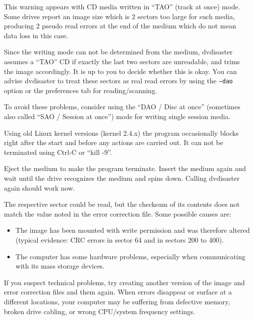    {This warning appears with CD media written in ``TAO'' (track at once) mode.
     Some drives report an image size which is 2 sectors too large for such media,
     producing 2 pseudo read errors at the end of the medium which do not mean data
     loss in this case.

     \smallskip
     
     Since the writing mode can not be determined from the medium, dvdisaster
     assumes a ``TAO'' CD if exactly the last two sectors are unreadable, and
     trims the image accordingly. It is up to you to decide whether this is okay.
     You can advise dvdisaster to treat these sectors as real read errors by using
     the {\tt --dao} option or the preferences tab for reading/scanning.

     \smallskip
     
     To avoid these problems, consider using the ``DAO / Disc at once''
     (sometimes also called ``SAO / Session at once'') mode for writing single session media.}

   { Using old Linux kernel versions (kernel 2.4.x) the program
     occasionally blocks right after the start and before any actions are
     carried out. It can not be terminated using Ctrl-C or ``kill -9''.

     \smallskip
     
     Eject the medium to make the program terminate. Insert the medium again
     and wait until the drive recognizes the medium and spins down. Calling
     dvdisaster again should work now. }

   {The respective sector could be read, but the checksum of its contents does
     not match the value noted in the error correction file. Some possible causes are:

 \begin{itemize}
 \item The image has been mounted with write permission and was
   therefore altered (typical evidence: CRC errors in sector 64 and in sectors 200 to 400).
 \item The computer has some hardware problems, especially when communicating with
   its mass storage devices.
 \end{itemize}
 
 If you suspect technical problems, try creating another version of the
 image and error correction files and  them again. When errors
 disappear or surface at a different locations, your computer may be
 suffering from defective memory, broken drive cabling, or wrong CPU/system
 frequency settings. }

